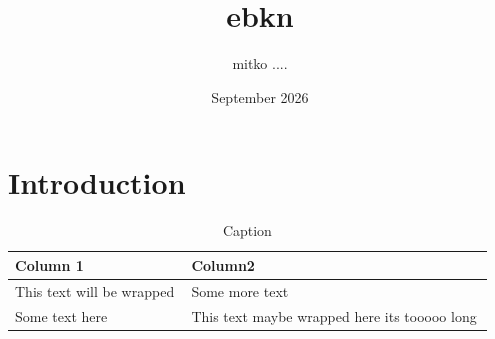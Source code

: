 \documentclass{article}
\title{ebkn}
\author{mitko ....}
\date{September 2026}
\begin{document}
\maketitle

\section{Introduction}

\begin{table}[ht]
    \centering
    \begin{tabular}{p{0.35\linewidth} | p{0.6\linewidth}}
      Column 1  					& Column2 \\ \hline
      This text will be wrapped 	& Some more text \\
      Some text here 				& This text maybe wrapped here its tooooo long \\
    \end{tabular}
    \caption{Caption}
    \label{tab:my_label}
\end{table}
\end{document}
